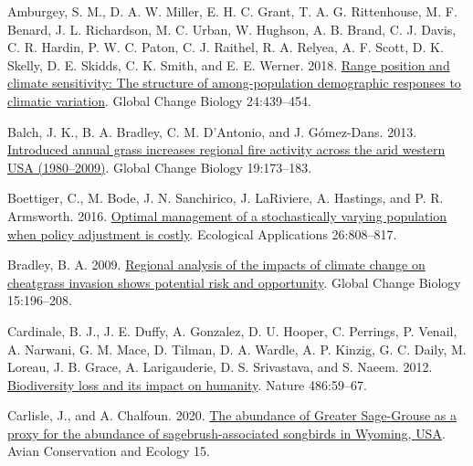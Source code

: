 \documentclass[
  12pt,
]{article}
\newlength{\cslhangindent}
\newlength{\cslentryspacingunit} %
\newenvironment{CSLReferences}[2] %
 {%
  \setlength{\parindent}{0pt}
  \ifodd #1
  \let\oldpar\par
  \def\par{\hangindent=\cslhangindent\oldpar}
  \fi
  \setlength{\parskip}{#2\cslentryspacingunit}
 }%
 {}
\begin{document}
\setlength{\parindent}{-0.2in}
\setlength{\leftskip}{0.2in}
\setlength{\parskip}{8pt}

\noindent

\hypertarget{refs}{}
\begin{CSLReferences}{1}{0}
\leavevmode{}%
Amburgey, S. M., D. A. W. Miller, E. H. C. Grant, T. A. G. Rittenhouse, M. F. Benard, J. L. Richardson, M. C. Urban, W. Hughson, A. B. Brand, C. J. Davis, C. R. Hardin, P. W. C. Paton, C. J. Raithel, R. A. Relyea, A. F. Scott, D. K. Skelly, D. E. Skidds, C. K. Smith, and E. E. Werner. 2018. \href{https://doi.org/10.1111/gcb.13817}{Range position and climate sensitivity: {The} structure of among-population demographic responses to climatic variation}. Global Change Biology 24:439--454.

\leavevmode{}%
Balch, J. K., B. A. Bradley, C. M. D'Antonio, and J. Gómez-Dans. 2013. \href{https://doi.org/10.1111/gcb.12046}{Introduced annual grass increases regional fire activity across the arid western {USA} (1980--2009)}. Global Change Biology 19:173--183.

\leavevmode{}%
Boettiger, C., M. Bode, J. N. Sanchirico, J. LaRiviere, A. Hastings, and P. R. Armsworth. 2016. \href{https://doi.org/10.1890/15-0236}{Optimal management of a stochastically varying population when policy adjustment is costly}. Ecological Applications 26:808--817.

\leavevmode{}%
Bradley, B. A. 2009. \href{https://doi.org/10.1111/j.1365-2486.2008.01709.x}{Regional analysis of the impacts of climate change on cheatgrass invasion shows potential risk and opportunity}. Global Change Biology 15:196--208.

\leavevmode{}%
Cardinale, B. J., J. E. Duffy, A. Gonzalez, D. U. Hooper, C. Perrings, P. Venail, A. Narwani, G. M. Mace, D. Tilman, D. A. Wardle, A. P. Kinzig, G. C. Daily, M. Loreau, J. B. Grace, A. Larigauderie, D. S. Srivastava, and S. Naeem. 2012. \href{https://doi.org/10.1038/nature11148}{Biodiversity loss and its impact on humanity}. Nature 486:59--67.

\leavevmode{}%
Carlisle, J., and A. Chalfoun. 2020. \href{https://doi.org/10.5751/ACE-01702-150216}{The abundance of {Greater} {Sage}-{Grouse} as a proxy for the abundance of sagebrush-associated songbirds in {Wyoming}, {USA}}. Avian Conservation and Ecology 15.


\end{CSLReferences}
\end{document}
